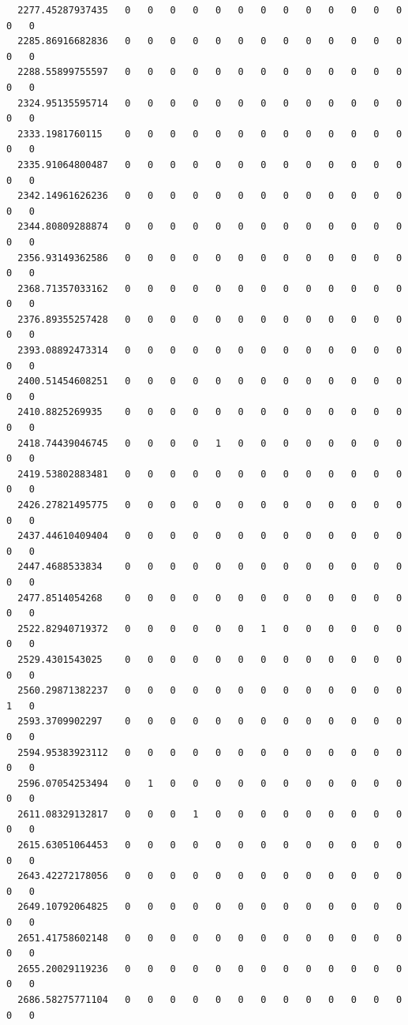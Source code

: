 \documentclass[
  letterpaper,
  DIV=11,
  numbers=noendperiod]{scrartcl}
\begin{document}
\begin{verbatim}
  2277.45287937435   0   0   0   0   0   0   0   0   0   0   0   0   0   0   0
  2285.86916682836   0   0   0   0   0   0   0   0   0   0   0   0   0   0   0
  2288.55899755597   0   0   0   0   0   0   0   0   0   0   0   0   0   0   0
  2324.95135595714   0   0   0   0   0   0   0   0   0   0   0   0   0   0   0
  2333.1981760115    0   0   0   0   0   0   0   0   0   0   0   0   0   0   0
  2335.91064800487   0   0   0   0   0   0   0   0   0   0   0   0   0   0   0
  2342.14961626236   0   0   0   0   0   0   0   0   0   0   0   0   0   0   0
  2344.80809288874   0   0   0   0   0   0   0   0   0   0   0   0   0   0   0
  2356.93149362586   0   0   0   0   0   0   0   0   0   0   0   0   0   0   0
  2368.71357033162   0   0   0   0   0   0   0   0   0   0   0   0   0   0   0
  2376.89355257428   0   0   0   0   0   0   0   0   0   0   0   0   0   0   0
  2393.08892473314   0   0   0   0   0   0   0   0   0   0   0   0   0   0   0
  2400.51454608251   0   0   0   0   0   0   0   0   0   0   0   0   0   0   0
  2410.8825269935    0   0   0   0   0   0   0   0   0   0   0   0   0   0   0
  2418.74439046745   0   0   0   0   1   0   0   0   0   0   0   0   0   0   0
  2419.53802883481   0   0   0   0   0   0   0   0   0   0   0   0   0   0   0
  2426.27821495775   0   0   0   0   0   0   0   0   0   0   0   0   0   0   0
  2437.44610409404   0   0   0   0   0   0   0   0   0   0   0   0   0   0   0
  2447.4688533834    0   0   0   0   0   0   0   0   0   0   0   0   0   0   0
  2477.8514054268    0   0   0   0   0   0   0   0   0   0   0   0   0   0   0
  2522.82940719372   0   0   0   0   0   0   1   0   0   0   0   0   0   0   0
  2529.4301543025    0   0   0   0   0   0   0   0   0   0   0   0   0   0   0
  2560.29871382237   0   0   0   0   0   0   0   0   0   0   0   0   0   1   0
  2593.3709902297    0   0   0   0   0   0   0   0   0   0   0   0   0   0   0
  2594.95383923112   0   0   0   0   0   0   0   0   0   0   0   0   0   0   0
  2596.07054253494   0   1   0   0   0   0   0   0   0   0   0   0   0   0   0
  2611.08329132817   0   0   0   1   0   0   0   0   0   0   0   0   0   0   0
  2615.63051064453   0   0   0   0   0   0   0   0   0   0   0   0   0   0   0
  2643.42272178056   0   0   0   0   0   0   0   0   0   0   0   0   0   0   0
  2649.10792064825   0   0   0   0   0   0   0   0   0   0   0   0   0   0   0
  2651.41758602148   0   0   0   0   0   0   0   0   0   0   0   0   0   0   0
  2655.20029119236   0   0   0   0   0   0   0   0   0   0   0   0   0   0   0
  2686.58275771104   0   0   0   0   0   0   0   0   0   0   0   0   0   0   0

\end{verbatim}
\end{document}
